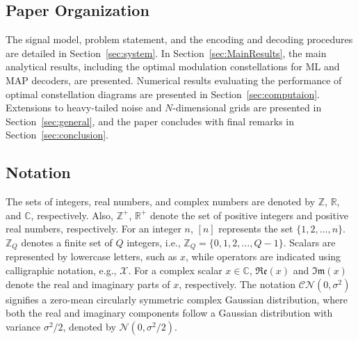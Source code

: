 \documentclass[journal,12pt,onecolumn,draftclsnofoot]{IEEEtran}
\theoremstyle{definition}
\begin{document}
\subsection{Paper Organization}


The signal model, problem statement, and the encoding and decoding procedures are detailed in Section~\ref{sec:system}. In Section~\ref{sec:MainResults},  the main analytical results, including the optimal modulation constellations for ML and MAP decoders, are presented. Numerical results evaluating the performance of optimal constellation diagrams are presented in Section~\ref{sec:computaion}. Extensions to heavy-tailed noise and $N$-dimensional grids are presented in Section~\ref{sec:general}, and the paper concludes with final remarks in Section~\ref{sec:conclusion}.

\subsection{Notation}

 The sets of integers, real numbers, and complex numbers are denoted by \(\mathbb{Z}\), \(\mathbb{R}\), and \(\mathbb{C}\), respectively. Also, $\mathbb{Z}^{+}$, $\mathbb{R}^{+}$ denote the set of positive integers and positive real numbers, respectively.  For an integer $n$, $[n]$ represents the set $\{1,2,\dots, n\}$. $\mathbb{Z}_Q$ denotes a finite set of $Q$ integers, i.e., $\mathbb{Z}_Q = \{0,1,2,\ldots,Q-1\}$.  Scalars are represented by lowercase letters, such as $x$, while operators are indicated using calligraphic notation, e.g., $\mathscr{X}$.  For a complex scalar $x\in \mathbb{C}$, $\mathfrak{Re}({x})$ and  $\mathfrak{Im}({x})$ denote the real and imaginary parts of $x$, respectively. The notation \(\mathcal{CN}(0, \sigma^2)\) signifies a zero-mean circularly symmetric complex Gaussian distribution, where both the real and imaginary components follow a Gaussian distribution with variance \(\sigma^2/2\), denoted by \(\mathcal{N}(0, \sigma^2/2)\).
\end{document}
